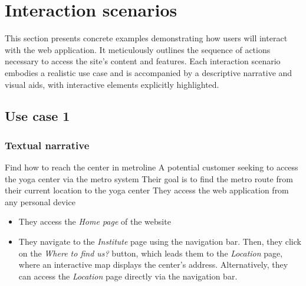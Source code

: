 \newcommand{\usecasetable}[6]{%
    \begin{center}
    \begin{tabularx}{\textwidth}{|>{\bfseries}l|X|}
    \hline
    Title: & #1 \\
    \hline
    Profile: & #2 \\
    \hline
    Goal: & #3 \\
    \hline
    Context: & #4 \\
    \hline
    Tasks: & #5 \\
    \hline
    \end{tabularx}
    \end{center}
}

\section{Interaction scenarios}

This section presents concrete examples demonstrating how users will interact with the web application. It meticulously
outlines the sequence of actions necessary to access the site’s content and features. Each interaction scenario
embodies a realistic use case and is accompanied by a descriptive narrative and visual aids, with interactive elements
explicitly highlighted.

\subsection{Use case 1}
\subsubsection{Textual narrative}


\usecasetable
    {Find how to reach the center in metroline}
    {A potential customer seeking to access the yoga center via the metro system}
    {Their goal is to find the metro route from their current location to the yoga center}
    {They access the web application from any personal device}
    {\begin{itemize}
         \item They access the \textit{Home page} of the website
         \item They navigate to the \textit{Institute} page using the navigation bar. Then, they click on the
               \textit{Where to find us?} button, which leads them to the \textit{Location} page, where an interactive map displays the center’s address. Alternatively, they can access the \textit{Location} page directly via the navigation bar.
    \end{itemize}
    }


